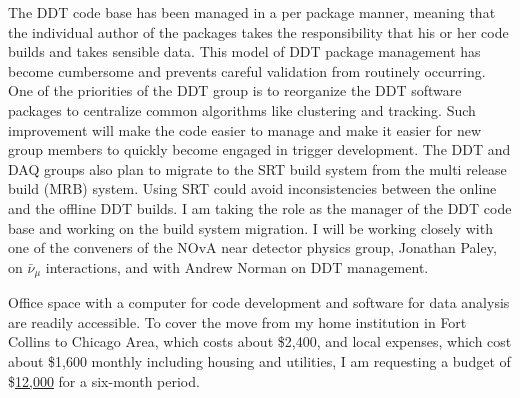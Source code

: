 \documentclass[a4paper, 11pt]{article} %
\begin{document}
The DDT code base has been managed in a per package manner, meaning that the individual author of the packages takes the responsibility that his or her code builds and takes sensible data. This model of DDT package management has become cumbersome and prevents careful validation from routinely occurring. One of the priorities of the DDT group is to reorganize the DDT software packages to centralize common algorithms like clustering and tracking. Such improvement will make the code easier to manage and make it easier for new group members to quickly become engaged in trigger development. The DDT and DAQ groups also plan to migrate to the SRT build system from the multi release build (MRB) system. Using SRT could avoid inconsistencies between the online and the offline DDT builds. I am taking the role as the manager of the DDT code base and working on the build system migration.
I will be working closely with one of the conveners of the NOvA near detector physics group, Jonathan Paley, on $\bar{\nu}_\mu$ interactions, and with Andrew Norman on DDT management.\newline

Office space with a computer for code development and software for data analysis are readily accessible. To cover the move from my home institution in Fort Collins to Chicago Area, which costs about \$2,400, and local expenses, which cost about \$1,600 monthly including housing and utilities, I am requesting a budget of \$\underline{12,000} for a six-month period.
\clearpage
\end{document}
